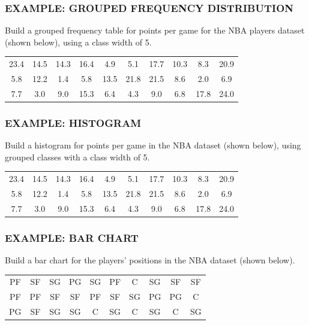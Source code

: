 \documentclass[8pt]{beamer}
\newcommand{\extitle}[1]{\frametitle{\fontfamily{fvs}\selectfont \small\color{black!70!blue!80!cyan}\uppercase{\bfseries Example: #1}}}
\def\solblank{\begin{tcolorbox}[colframe=black!50!blue!50!cyan,
colback=white,
bottomrule=0mm,
rightrule=0mm,
sharp corners=all] 
\vspace{6in}
\text{}
\end{tcolorbox}}
\begin{document}
\begin{frame}
\extitle{Grouped Frequency Distribution}
Build a grouped frequency table for points per game for the NBA players dataset (shown below), using a class width of 5.
\begin{center}
\begin{tabular}{c c c c c c c c c c}
23.4 & 14.5 & 14.3 & 16.4 & 4.9 & 5.1 & 17.7 & 10.3 & 8.3 & 20.9\\
5.8 & 12.2 & 1.4 & 5.8 & 13.5 & 21.8 & 21.5 & 8.6 & 2.0 & 6.9\\
7.7 & 3.0 & 9.0 & 15.3 & 6.4 & 4.3 & 9.0 & 6.8 & 17.8 & 24.0
\end{tabular}
\end{center}

\solblank
\end{frame}

\begin{frame}
\extitle{Histogram}
Build a histogram for points per game in the NBA dataset (shown below), using grouped classes with a class width of 5.
\begin{center}
\begin{tabular}{c c c c c c c c c c}
23.4 & 14.5 & 14.3 & 16.4 & 4.9 & 5.1 & 17.7 & 10.3 & 8.3 & 20.9\\
5.8 & 12.2 & 1.4 & 5.8 & 13.5 & 21.8 & 21.5 & 8.6 & 2.0 & 6.9\\
7.7 & 3.0 & 9.0 & 15.3 & 6.4 & 4.3 & 9.0 & 6.8 & 17.8 & 24.0
\end{tabular}
\end{center}

\solblank
\end{frame}

\begin{frame}
\extitle{Bar Chart}
Build a bar chart for the players' positions in the NBA dataset (shown below).
\begin{center}
\begin{tabular}{c c c c c c c c c c}
PF & SF & SG & PG & SG & PF & C & SG & SF & SF\\
PF & PF & SF & SF & PF & SF & SG & PG & PG & C\\
PG & SF & SG & SG & C & SG & C & SG & C & SG
\end{tabular}
\end{center}

\solblank
\end{frame}
\end{document}
